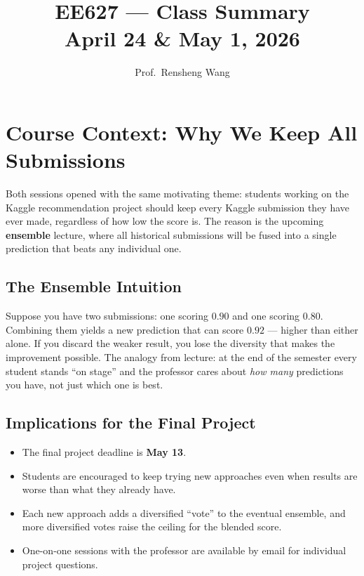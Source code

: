 \documentclass[11pt]{article}
\title{\textbf{EE627 --- Class Summary}\\[0.4em]
       \large April 24 \& May 1, 2026}
\author{Prof.\ Rensheng Wang}
\date{}
\begin{document}
\maketitle
\tableofcontents
\newpage

\section{Course Context: Why We Keep All Submissions}

Both sessions opened with the same motivating theme: students working on the Kaggle recommendation project should keep every Kaggle submission they have ever made, regardless of how low the score is. The reason is the upcoming \textbf{ensemble} lecture, where all historical submissions will be fused into a single prediction that beats any individual one.

\subsection{The Ensemble Intuition}
Suppose you have two submissions: one scoring $0.90$ and one scoring $0.80$. Combining them yields a new prediction that can score $0.92$ --- higher than either alone. If you discard the weaker result, you lose the diversity that makes the improvement possible. The analogy from lecture: at the end of the semester every student stands ``on stage'' and the professor cares about \emph{how many} predictions you have, not just which one is best.

\subsection{Implications for the Final Project}
\begin{itemize}
    \item The final project deadline is \textbf{May 13}.
    \item Students are encouraged to keep trying new approaches even when results are worse than what they already have.
    \item Each new approach adds a diversified ``vote'' to the eventual ensemble, and more diversified votes raise the ceiling for the blended score.
    \item One-on-one sessions with the professor are available by email for individual project questions.
\end{itemize}
\end{document}
